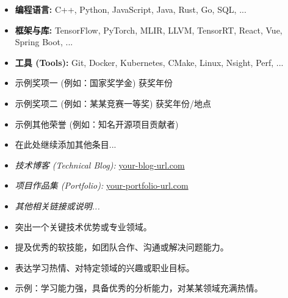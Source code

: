 \documentclass{resume}
\begin{document}
\begin{itemize}[parsep=0.2ex] 
    \item \textbf{编程语言:} C++, Python, JavaScript, Java, Rust, Go, SQL, ...
    \item \textbf{框架与库:} TensorFlow, PyTorch, MLIR, LLVM, TensorRT, React, Vue, Spring Boot, ...
    \item \textbf{工具 (Tools):} Git, Docker, Kubernetes, CMake, Linux, Nsight, Perf, ...
\end{itemize}

\begin{itemize}[parsep=0.2ex]
  \item 示例奖项一 (例如：国家奖学金) \hfill{获奖年份} 
  \item 示例奖项二 (例如：某某竞赛一等奖) \hfill{获奖年份/地点} 
  \item 示例其他荣誉 (例如：知名开源项目贡献者) 
  \item 在此处继续添加其他条目...
\end{itemize}

\begin{itemize}[parsep=0.2ex]
    \item \textit{技术博客 (Technical Blog):} \href{https://your-blog-url.com}{your-blog-url.com} 
    \item \textit{项目作品集 (Portfolio):} \href{https://your-portfolio-url.com}{your-portfolio-url.com}
    \item \textit{其他相关链接或说明...} 
\end{itemize}

\begin{itemize}[parsep=0.2ex]
  \item 突出一个关键技术优势或专业领域。
  \item 提及优秀的软技能，如团队合作、沟通或解决问题能力。
  \item 表达学习热情、对特定领域的兴趣或职业目标。
  \item 示例：学习能力强，具备优秀的分析能力，对某某领域充满热情。
\end{itemize}

\end{document}
